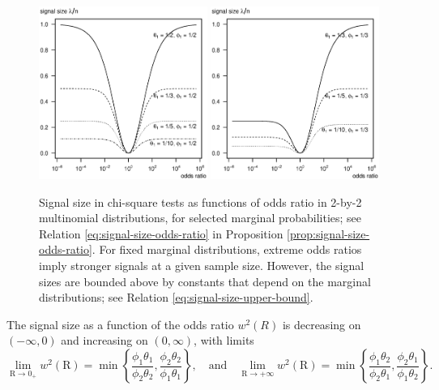 \begin{figure}
      \centering
      \includegraphics[width=0.49\textwidth]{./singal-vs-odds-p05}
      \includegraphics[width=0.49\textwidth]{./singal-vs-odds-p0333}            
      \caption{Signal size in chi-square tests as functions of odds ratio in 2-by-2 multinomial distributions, for selected marginal probabilities; see Relation \eqref{eq:signal-size-odds-ratio} in Proposition \ref{prop:signal-size-odds-ratio}.
      For fixed marginal distributions, extreme odds ratios imply stronger signals at a given sample size.
      However, the signal sizes are bounded above by constants that depend on the marginal distributions; see Relation \eqref{eq:signal-size-upper-bound}.
      } 
      \label{fig:signal-vs-odds}
\end{figure}

\begin{corollary} \label{cor:signal-limits-OR}
The signal size as a function of the odds ratio $w^2(R)$ is decreasing on $(-\infty,0)$ and increasing on $(0,\infty)$, with limits
\begin{equation} \label{eq:signal-size-upper-bound}
    \lim_{\text{R}\to0_+} w^2(\text{R}) = \min\left\{\frac{\phi_1\theta_1}{\phi_2\theta_2}, \frac{\phi_2\theta_2}{\phi_1\theta_1}\right\},
\quad
\text{and}
\quad
    \lim_{\text{R}\to+\infty} w^2(\text{R}) = \min\left\{\frac{\phi_1\theta_2}{\phi_2\theta_1}, \frac{\phi_2\theta_1}{\phi_1\theta_2}\right\}.
\end{equation}
\end{corollary}


